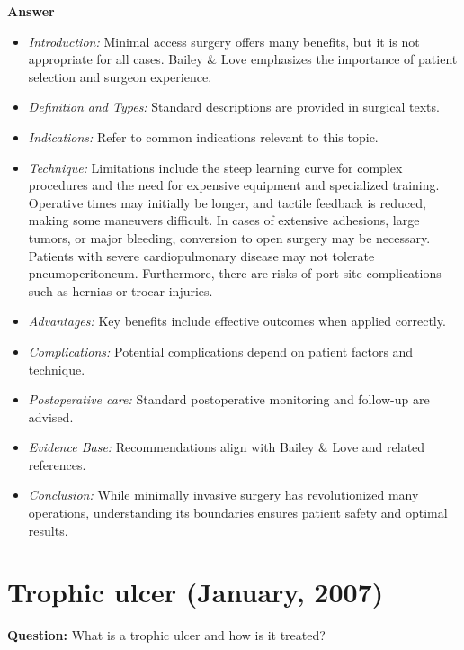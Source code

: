 \documentclass{article}
\begin{document}
\textbf{Answer}
\begin{itemize}

\item \emph{Introduction:} Minimal access surgery offers many benefits, but it is not appropriate for all cases. Bailey \& Love emphasizes the importance of patient selection and surgeon experience.
\item \emph{Definition and Types:} Standard descriptions are provided in surgical texts.
\item \emph{Indications:} Refer to common indications relevant to this topic.

\item \emph{Technique:} Limitations include the steep learning curve for complex procedures and the need for expensive equipment and specialized training. Operative times may initially be longer, and tactile feedback is reduced, making some maneuvers difficult. In cases of extensive adhesions, large tumors, or major bleeding, conversion to open surgery may be necessary. Patients with severe cardiopulmonary disease may not tolerate pneumoperitoneum. Furthermore, there are risks of port-site complications such as hernias or trocar injuries.
\item \emph{Advantages:} Key benefits include effective outcomes when applied correctly.
\item \emph{Complications:} Potential complications depend on patient factors and technique.
\item \emph{Postoperative care:} Standard postoperative monitoring and follow-up are advised.
\item \emph{Evidence Base:} Recommendations align with Bailey \& Love and related references.

\item \emph{Conclusion:} While minimally invasive surgery has revolutionized many operations, understanding its boundaries ensures patient safety and optimal results.


\end{itemize}

\section{Trophic ulcer (January, 2007)}

\textbf{Question:} What is a trophic ulcer and how is it treated?
\end{document}
